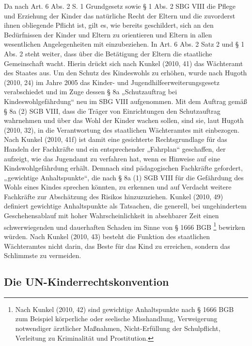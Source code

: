 Da nach Art. 6 Abs. 2 S. 1 Grundgesetz sowie § 1 Abs. 2 SBG VIII die Pflege und Erziehung der Kinder das natürliche Recht der Eltern und die zuvorderst ihnen obliegende Pflicht ist, gilt es, wie bereits geschildert, sich an den Bedürfnissen der Kinder und Eltern zu orientieren und Eltern in allen wesentlichen Angelegenheiten mit einzubeziehen. In Art. 6 Abs. 2 Satz 2 und § 1 Abs. 2 steht weiter, dass über die Betätigung der Eltern die staatliche Gemeinschaft wacht. Hierin drückt sich nach Kunkel (2010, 41) das Wächteramt des Staates aus. Um den Schutz des Kindeswohls zu erhöhen, wurde nach Hugoth (2010, 24) im Jahre 2005 das Kinder- und Jugendhilfeerweiterungsgesetz   verabschiedet und im Zuge dessen § 8a „Schutzauftrag bei Kindeswohlgefährdung“ neu im SBG VIII aufgenommen. Mit dem Auftrag gemäß § 8a (2) SGB VIII, dass die Träger von Einrichtungen den Schutzauftrag wahrnehmen und über das Wohl der Kinder wachen sollen, sind sie, laut Hugoth (2010, 32), in die Verantwortung des staatlichen Wächteramtes mit einbezogen. Nach Kunkel (2010, 41f) ist damit eine gesichterte Rechtsgrundlage für das Handeln der Fachkräfte und ein entsprechender „Fahrplan“ geschaffen, der aufzeigt, wie das Jugendamt zu verfahren hat, wenn es Hinweise auf eine Kindswohlgefährdung erhält. Demnach sind pädagogischen Fachkräfte gefordert, „gewichtige Anhaltspunkte“, die nach § 8a (1) SGB VIII für die Gefährdung des Wohls eines Kindes sprechen könnten, zu erkennen und auf Verdacht weitere Fachkräfte zur Abschätzung des Risikos hinzuzuziehen. Kunkel (2010, 49) definiert gewichtige Anhaltspunkte als Tatsachen, die generell, bei ungehindertem Geschehensablauf mit hoher Wahrscheinlichkeit in absehbarer Zeit einen schwerwiegenden und dauerhaften Schaden im Sinne von § 1666 BGB \footnote{Nach Kunkel (2010, 42) sind gewichtige Anhaltspunkte nach § 1666 BGB zum Beispiel körperliche oder seelische Misshandlung, Verweigerung notwendiger ärztlicher Maßnahmen, Nicht-Erfüllung der Schulpflicht, Verleitung zu Kriminalität und Prostitution.} bewirken würden. Nach Kunkel (2010, 43) besteht die Funktion des staatlichen Wächteramtes nicht darin, das Beste für das Kind zu erreichen, sondern das Schlimmste zu vermeiden.

\subsection{Die UN-Kinderrechtskonvention}


